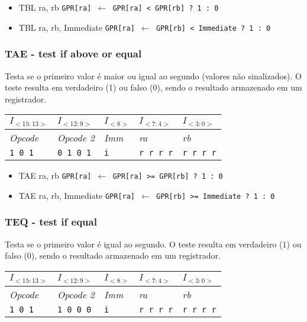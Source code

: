 \documentclass[11pt,a4paper]{report}
\begin{document}
\begin{itemize}
\item TBL ra, rb
\subitem \texttt{GPR[ra] $\leftarrow$ GPR[ra] < GPR[rb] ? 1 : 0}
\item TBL ra, rb, Immediate
\subitem \texttt{GPR[ra] $\leftarrow$ GPR[rb] < Immediate ? 1 : 0}
\end{itemize}

\subsubsection{TAE - test if above or equal}
Testa se o primeiro valor é maior ou igual ao segundo (valores não
sinalizados). O teste resulta em verdadeiro (1) ou falso (0), sendo o
resultado armazenado em um registrador.

\begin{table}[htb!]
\centering
\begin{tabular}{|p{2cm}|p{2cm}|p{2cm}|p{2cm}|p{2cm}|}
\hline
$I_{<15:13>}$ & $I_{<12:9>}$ & $I_{<8>}$ & $I_{<7:4>}$ & $I_{<3:0>}$  \\ \hline
\textit{Opcode} & \textit{Opcode 2} & \textit{Imm} & \textit{ra} & \textit{rb} \\ \hline
\texttt{1 0 1} & \texttt{0 1 0 1} & \texttt{i} & \texttt{r r r r} & \texttt{r r r r} \\ \hline
\end{tabular}
\end{table}

\begin{itemize}
\item TAE ra, rb
\subitem \texttt{GPR[ra] $\leftarrow$ GPR[ra] >= GPR[rb] ? 1 : 0}
\item TAE ra, rb, Immediate
\subitem \texttt{GPR[ra] $\leftarrow$ GPR[rb] >= Immediate ? 1 : 0}
\end{itemize}

\subsubsection{TEQ - test if equal}
Testa se o primeiro valor é igual ao segundo. O teste resulta em
verdadeiro (1) ou falso (0), sendo o resultado armazenado em um
registrador.

\begin{table}[htb!]
\centering
\begin{tabular}{|p{2cm}|p{2cm}|p{2cm}|p{2cm}|p{2cm}|}
\hline
$I_{<15:13>}$ & $I_{<12:9>}$ & $I_{<8>}$ & $I_{<7:4>}$ & $I_{<3:0>}$  \\ \hline
\textit{Opcode} & \textit{Opcode 2} & \textit{Imm} & \textit{ra} & \textit{rb} \\ \hline
\texttt{1 0 1} & \texttt{1 0 0 0} & \texttt{i} & \texttt{r r r r} & \texttt{r r r r} \\ \hline
\end{tabular}
\end{table}
\end{document}
